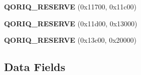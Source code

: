 \begin{DoxyCompactItemize}
\mbox{\label{structqoriq__pic_acf6748d545ed21b338e17438a060bd97}} 
{\bfseries Q\+O\+R\+I\+Q\+\_\+\+R\+E\+S\+E\+R\+VE} (0x11700, 0x11c00)
\item 
\mbox{\label{structqoriq__pic_a151aa02d116132a141f8cb833627d40d}} 
{\bfseries Q\+O\+R\+I\+Q\+\_\+\+R\+E\+S\+E\+R\+VE} (0x11d00, 0x13000)
\item 
\mbox{\label{structqoriq__pic_a4b09e2b756631056a10cfb01a327fe2f}} 
{\bfseries Q\+O\+R\+I\+Q\+\_\+\+R\+E\+S\+E\+R\+VE} (0x13c00, 0x20000)
\end{DoxyCompactItemize}
\subsection*{Data Fields}
